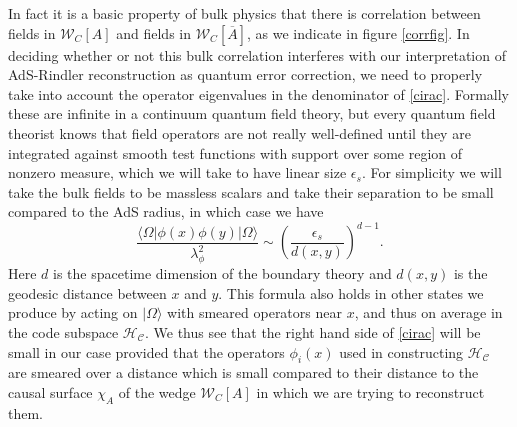 \documentclass[11pt]{article}
\newcommand{\be}{\begin{equation}}
\newcommand{\ee}{\end{equation}}
\newcommand{\HC}{\mathcal{H}_{\mathcal{C}}}
\newcommand{\lan}{\langle}
\newcommand{\ran}{\rangle}
\newcommand{\W}{\mathcal{W}}
\newcommand{\ol}{\overline}
\begin{document}
In fact it is a basic property of bulk physics that there is correlation between fields in $\W_C[A]$ and fields in $\W_C[\ol{A}]$, as we indicate in figure \ref{corrfig}. In deciding whether or not this bulk correlation interferes with our interpretation of AdS-Rindler reconstruction as quantum error correction, we need to properly take into account the operator eigenvalues in the denominator of \eqref{cirac}.  Formally these are infinite in a continuum quantum field theory, but every quantum field theorist knows that field operators are not really well-defined until they are integrated against smooth test functions with support over some region of nonzero measure, which we will take to have linear size $\epsilon_s$.  For simplicity we will take the bulk fields to be massless scalars and take their separation to be small compared to the AdS radius, in which case we have
\be\label{bulkcorr}
\frac{\lan \Omega|\phi(x)\phi(y)|\Omega\ran}{\lambda_\phi^2}\sim\left(\frac{\epsilon_s}{d(x,y)}\right)^{d-1}.
\ee
Here $d$ is the spacetime dimension of the boundary theory and $d(x,y)$ is the geodesic distance between $x$ and $y$.  This formula also holds in other states we produce by acting on $|\Omega\ran$ with smeared operators near $x$, and thus on average in the code subspace $\HC$.  We thus see that the right hand side of \eqref{cirac} will be small in our case provided that the operators $\phi_i(x)$ used in constructing $\HC$ are smeared over a distance which is small compared to their distance to the causal surface $\chi_A$ of the wedge $\W_C[A]$ in which we are trying to reconstruct them.  
\end{document}
